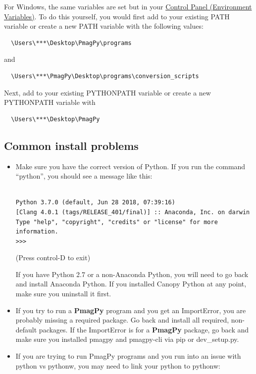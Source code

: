 \documentclass[11pt]{book}
\begin{document}
{For Windows, the same variables are set but in your \href{https://www.java.com/en/download/help/path.xml}{Control Panel (Environment Variables)}.  To do this yourself, you would first add to your existing PATH variable or create a new PATH variable with the following values: \begin{verbatim}
  \Users\***\Desktop\PmagPy\programs
\end{verbatim}
and \begin{verbatim}
  \Users\***\PmagPy\Desktop\programs\conversion_scripts
\end{verbatim}
Next, add to your existing PYTHONPATH variable or create a new PYTHONPATH variable with \begin{verbatim}
  \Users\***\Desktop\PmagPy
\end{verbatim}

\subsection{Common install problems}

\begin{itemize}

\item Make sure you have the correct version of Python.  If you run the command ``python'', you should see a message like this:

\begin{verbatim}

Python 3.7.0 (default, Jun 28 2018, 07:39:16)
[Clang 4.0.1 (tags/RELEASE_401/final)] :: Anaconda, Inc. on darwin
Type "help", "copyright", "credits" or "license" for more information.
>>>
\end{verbatim}
(Press control-D to exit)

If you have Python 2.7 or a non-Anaconda Python, you will need to go back and install Anaconda Python.  If you installed Canopy Python at any point, make sure you uninstall it first.


\item If you try to run a {\bf PmagPy} program and you get an ImportError, you are probably missing a required package.  Go back and install all required, non-default packages.  If the ImportError is for a {\bf PmagPy} package, go back and make sure you installed pmagpy and pmagpy-cli via pip or dev\_setup.py.

\item If you are trying to run PmagPy programs and you run into an issue with python vs pythonw, you may need to link your python to pythonw:
  \begin{verbatim}


\end{verbatim}
\end{itemize}}
\end{document}
